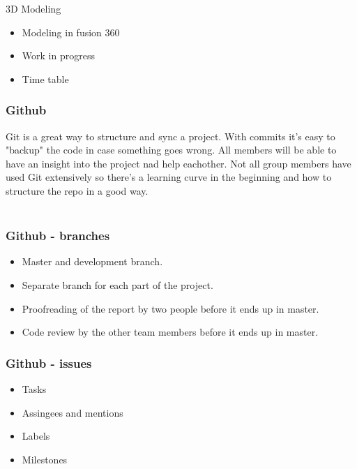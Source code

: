 \documentclass{beamer}
\begin{document}


\begin{frame}{3D Modeling}

    \begin{itemize}
        \item Modeling in fusion 360
        \item Work in progress
        \item Time table
    \end{itemize}
\end{frame}









\begin{frame}
    \frametitle{Github}
    Git is a great way to structure and sync a project. With commits it's easy to 
    "backup" the code in case something goes wrong. All members will be able to 
    have an insight into the project nad help eachother. Not all group members
    have used Git extensively so there's a learning curve in the beginning and how 
    to structure the repo in a good way. 
    \\~\
\end{frame}

\begin{frame}
    \frametitle{Github - branches}
    \begin{itemize}
        \item Master and development branch.
        \item Separate branch for each part of the project.
        \item Proofreading of the report by two people before it ends up in master.
        \item Code review by the other team members before it ends up in master. 
    \end{itemize}  
\end{frame}

\begin{frame}
    \frametitle{Github - issues}
    \begin{itemize}
        \item Tasks
        \item Assingees and mentions
        \item Labels
        \item Milestones
    \end{itemize}  
\end{frame}
\end{document}
